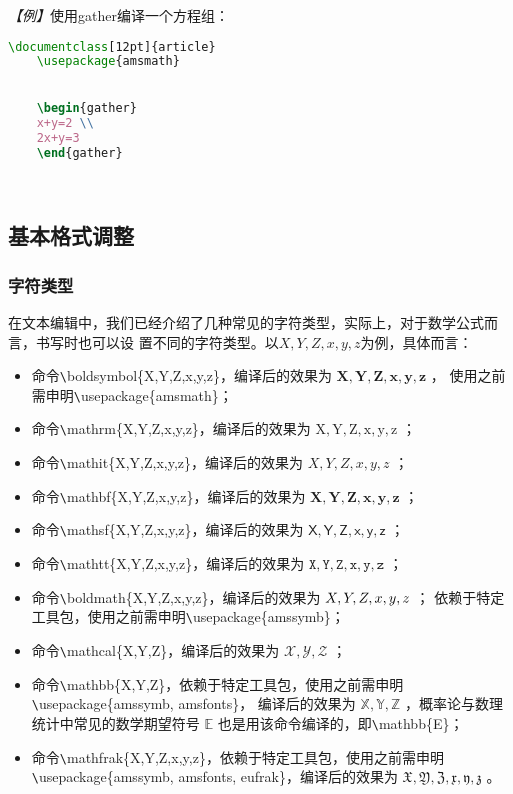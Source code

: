 \emph{【例】}使用gather编译一个方程组：
\begin{lstlisting}[language=TeX]
    \documentclass[12pt]{article}
    \usepackage{amsmath}
    

    \begin{gather}
    x+y=2 \\
    2x+y=3
    \end{gather}

    
\end{lstlisting}

\subsection{基本格式调整}
\subsubsection{字符类型}
在文本编辑中，我们已经介绍了几种常见的字符类型，实际上，对于数学公式而言，书写时也可以设
置不同的字符类型。以$X,Y,Z,x,y,z$为例，具体而言：
\begin{itemize}
    \item 命令\verb|\|boldsymbol\{X,Y,Z,x,y,z\}，编译后的效果为 $\boldsymbol{X,Y,Z,x,y,z}$ ，
          使用之前需申明\verb|\|usepackage\{amsmath\}；
    \item 命令\verb|\|mathrm\{X,Y,Z,x,y,z\}，编译后的效果为 $\mathrm{X,Y,Z,x,y,z}$ ；
    \item 命令\verb|\|mathit\{X,Y,Z,x,y,z\}，编译后的效果为 $\mathit{X,Y,Z,x,y,z}$ ；
    \item 命令\verb|\|mathbf\{X,Y,Z,x,y,z\}，编译后的效果为 $\mathbf{X,Y,Z,x,y,z}$ ；
    \item 命令\verb|\|mathsf\{X,Y,Z,x,y,z\}，编译后的效果为 $\mathsf{X,Y,Z,x,y,z}$ ；
    \item 命令\verb|\|mathtt\{X,Y,Z,x,y,z\}，编译后的效果为 $\mathtt{X,Y,Z,x,y,z}$ ；
    \item 命令\verb|\|boldmath\{X,Y,Z,x,y,z\}，编译后的效果为 $\boldmath{X,Y,Z,x,y,z}$ ；
          依赖于特定工具包，使用之前需申明\verb|\|usepackage\{amssymb\}；
    \item 命令\verb|\|mathcal\{X,Y,Z\}，编译后的效果为 $\mathcal{X,Y,Z}$ ；
    \item 命令\verb|\|mathbb\{X,Y,Z\}，依赖于特定工具包，使用之前需申明\verb|\|usepackage\{amssymb, amsfonts\}，
          编译后的效果为 $\mathbb{X,Y,Z}$ ，概率论与数理统计中常见的数学期望符号 $\mathbb{E}$
          也是用该命令编译的，即\verb|\|mathbb\{E\}；
    \item 命令\verb|\|mathfrak\{X,Y,Z,x,y,z\}，依赖于特定工具包，使用之前需申明
          \verb|\|usepackage\{amssymb, amsfonts, eufrak\}，编译后的效果为 $\mathfrak{X,Y,Z,x,y,z}$ 。
\end{itemize}

